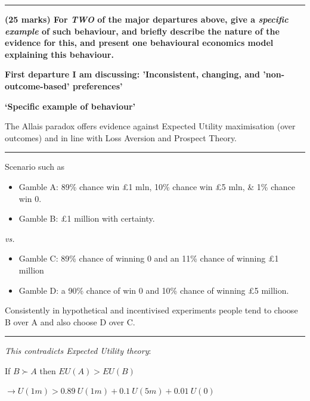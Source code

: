 \documentclass[]{article}
\begin{document}
\begin{center}\rule{0.5\linewidth}{\linethickness}\end{center}

\textbf{(25 marks) For \textit{TWO} of the major departures above, give
a \textit{specific example} of such behaviour, and briefly describe the
nature of the evidence for this, and present one behavioural economics
model explaining this behaviour.}

\textbf{First departure I am discussing: 'Inconsistent, changing, and 'non-outcome-based' preferences'}

\bigskip

\textbf{`Specific example of behaviour'}

The Allais paradox offers evidence against Expected Utility maximisation
(over outcomes) and in line with Loss Aversion and Prospect Theory.

\begin{center}\rule{0.5\linewidth}{\linethickness}\end{center}

Scenario such as

\begin{itemize}
\item
  Gamble A: 89\% chance win \pounds 1 mln, 10\% chance win \pounds 5
  mln, \& 1\% chance win 0.
\item
  Gamble B: \pounds1 million with certainty.
\end{itemize}

\textit{vs.}

\begin{itemize}
\item
  Gamble C: 89\% chance of winning 0 and an 11\% chance of winning
  \pounds1 million
\item
  Gamble D: a 90\% chance of win 0 and 10\% chance of winning \pounds5
  million.
\end{itemize}

Consistently in hypothetical and incentivised experiments people tend to
choose B over A and also choose D over C.

\begin{center}\rule{0.5\linewidth}{\linethickness}\end{center}

\textit{This contradicts Expected Utility theory}:

If \(B \succ A\) then \(EU(A) > EU(B)\)

\(\rightarrow U(1m) > 0.89 \: U(1m) + 0.1 \: U(5m) + 0.01 \: U(0)\)
\end{document}
